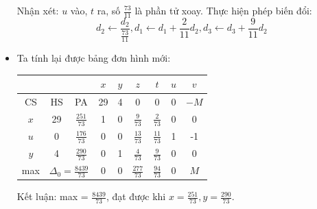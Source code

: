 \documentclass[12pt,a4paper]{article}
\begin{document}
\begin{itemize}
\begin{table}[H]
{\begin{tabular}{|ccc|c|c|c|c|c|c|}
						\end{tabular}}
					\end{table}
					Nhận xét: $u$ vào, $t$ ra, số $\frac{73}{11}$ là phần tử xoay.
					Thực hiện phép biến đổi:
					\[d_2 \leftarrow \frac{d_2}{\frac{73}{11}}, d_1 \leftarrow d_1 + \frac{2}{11}d_2, d_3 \leftarrow d_3 + \frac{9}{11}d_2\]
				\item Ta tính lại được bảng đơn hình mới:
					\begin{table}[H]
						\centering
						\setlength{\tabcolsep}{1.2em}
						{\renewcommand{\arraystretch}{1.5}\begin{tabular}{|ccc|c|c|c|c|c|c|}
						\hline
						\multicolumn{3}{|c|}{}                                                                                                          & \cellcolor[HTML]{B4C6E7}$x$ & \cellcolor[HTML]{B4C6E7}$y$ & \cellcolor[HTML]{B4C6E7}$z$ & \cellcolor[HTML]{B4C6E7}$t$ & \cellcolor[HTML]{B4C6E7}$u$ & \cellcolor[HTML]{B4C6E7}$v$ \\ \hline
						\multicolumn{1}{|c|}{\cellcolor[HTML]{B4C6E7}CS} & \multicolumn{1}{c|}{\cellcolor[HTML]{B4C6E7}HS} & \cellcolor[HTML]{B4C6E7}PA & 29                          & 4                           & 0                           & 0                           & 0                           & $-M$                        \\ \hline
						\multicolumn{1}{|c|}{$x$}                        & \multicolumn{1}{c|}{29}                         & $\frac{251}{73}$           & 1                           & 0                           & $\frac{9}{73}$              & $\frac{2}{73}$              & 0                           & 0                           \\ \hline
						\multicolumn{1}{|c|}{$u$}                        & \multicolumn{1}{c|}{0}                          & $\frac{176}{73}$           & 0                           & 0                           & $\frac{13}{73}$             & $\frac{11}{73}$             & 1                           & -1                          \\ \hline
						\multicolumn{1}{|c|}{$y$}                        & \multicolumn{1}{c|}{4}                          & $\frac{290}{73}$           & 0                           & 1                           & $\frac{4}{73}$             & $\frac{9}{73}$              & 0                           & 0                           \\ \hline
						\multicolumn{1}{|c|}{max}                        & \multicolumn{2}{c|}{$\Delta_0 =   \frac{8439}{73}$}                          & 0                           & 0                           & $\frac{277}{73}$            & $\frac{94}{73}$             & 0                           & $M$                         \\ \hline
						\end{tabular}}
					\end{table}
					Kết luận: max = $\frac{8439}{73}$, đạt được khi $x = \frac{251}{73}, y = \frac{290}{73}$.
			\end{itemize}
\end{document}
